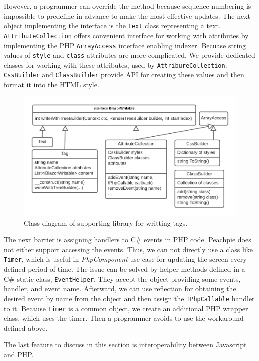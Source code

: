 However, a programmer can override the method because sequence numbering is impossible to predefine in advance to make the most effective updates.
The next object implementing the interface is the \texttt{Text} class representing a text.
\texttt{AttributeCollection} offers convenient interface for working with attributes by implementing the PHP \texttt{ArrayAccess} interface enabling indexer.
Becuase string values of \texttt{style} and \texttt{class} attributes are more complicated.
We provide dedicated classes for working with these attributes, used by \texttt{AttribureCollection}.
\texttt{CssBuilder} and \texttt{ClassBuilder} provide API for creating these values and then format it into the HTML style.
\par
\begin{figure}\centering
\includegraphics[scale=0.8]{./img/ComponentLibrary}
\caption{Class diagram of supporting library for writting tags.}
\label{img16:diagram}
\end{figure} 
\par
The next barrier is assigning handlers to C\# events in PHP code.
Peachpie does not either support accessing the events.
Thus, we can not directly use a class like \texttt{Timer}, which is useful in \textit{PhpComponent} use case for updating the screen every defined period of time.
The issue can be solved by helper methods defined in a C\# static class, \texttt{EventHelper}.
They accept the object providing some events, handler, and event name.
Afterward, we can use reflection for obtaining the desired event by name from the object and then assign the \texttt{IPhpCallable} handler to it.
Because \texttt{Timer} is a common object, we create an additional PHP wrapper class, which uses the timer.
Then a programmer avoids to use the workaround defined above.
\par
The last feature to discuss in this section is interoperability between Javascript and PHP.
